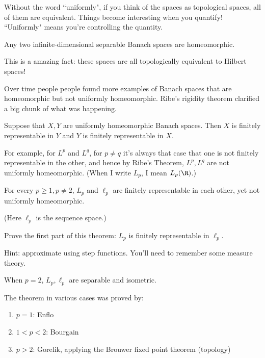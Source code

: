 Without the word ``uniformly", if you think of the spaces as topological spaces, all of them are equivalent. Things become interesting when you quantify! ``Uniformly" means you're controlling the quantity.
\begin{thm}[Kadec]
Any two infinite-dimensional separable Banach spaces are homeomorphic.
\end{thm}
This is a amazing fact: these spaces are all topologically equivalent to Hilbert spaces!

Over time people people found more examples of Banach spaces that are homeomorphic but not uniformly homeomorphic. Ribe's rigidity theorem clarified a big chunk of what was happening.

\begin{thm}
Suppose that $X,Y$ are uniformly homeomorphic Banach spaces.  Then $X$ is finitely representable in $Y$ and $Y$ is finitely representable in $X$.
\end{thm} 
For example, for $L^p$ and $L^q$, for $p\ne q$ it's always that case that one is not finitely representable in the other, and hence by Ribe's Theorem, $L^p,L^q$ are not uniformly homeomorphic.
(When I write $L_p$, I mean $L_p(\R)$.)

\begin{thm}
For every $p\ge 1,p\ne2$, $L_p$ and $\ell_p$ are finitely representable in each other, yet not uniformly homeomorphic.
\end{thm}
(Here $\ell_p$ is the sequence space.)

\begin{exr}
Prove the first part of this theorem: $L_p$ is finitely representable in $\ell_p$.
\end{exr}
Hint: approximate using step functions. You'll need to remember some measure theory.

When $p=2$, $L_p,\ell_p$ are separable and isometric.

The theorem in various cases was proved by:
\begin{enumerate}
\item
$p=1$: Enflo
\item
$1<p<2$: Bourgain
\item
$p>2$: Gorelik, applying the Brouwer fixed point theorem (topology)
\end{enumerate}

